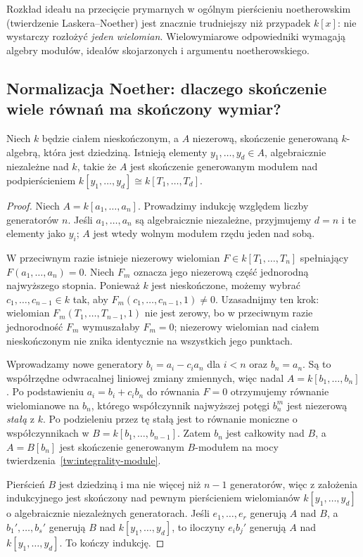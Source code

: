 \begin{uwaga}
Rozkład ideału na przecięcie prymarnych w ogólnym
pierścieniu noetherowskim (twierdzenie Laskera--Noether)
jest znacznie trudniejszy niż przypadek $k[x]$:
nie wystarczy rozłożyć \emph{jeden wielomian}.
Wielowymiarowe odpowiedniki wymagają
algebry modułów, ideałów skojarzonych i argumentu
noetherowskiego.
\end{uwaga}

\subsection{Normalizacja Noether: dlaczego skończenie wiele równań ma skończony wymiar?}
\begin{twierdzenie}
\label{tw:noether-norm}
Niech $k$ będzie ciałem nieskończonym, a $A$
niezerową, skończenie generowaną $k$-algebrą,
która jest dziedziną. Istnieją elementy
$y_1,\ldots,y_d\in A$, algebraicznie niezależne
nad $k$, takie że $A$ jest skończenie generowanym
modułem nad podpierścieniem
$k[y_1,\ldots,y_d]\cong k[T_1,\ldots,T_d]$.
\end{twierdzenie}
\begin{proof}
Niech $A=k[a_1,\ldots,a_n]$. Prowadzimy indukcję
względem liczby generatorów $n$. Jeśli
$a_1,\ldots,a_n$ są algebraicznie niezależne,
przyjmujemy $d=n$ i te elementy jako $y_i$;
$A$ jest wtedy wolnym modułem rzędu jeden nad sobą.

W przeciwnym razie istnieje niezerowy wielomian
$F\in k[T_1,\ldots,T_n]$ spełniający
$F(a_1,\ldots,a_n)=0$. Niech $F_m$ oznacza
jego niezerową część jednorodną najwyższego stopnia.
Ponieważ $k$ jest nieskończone, możemy wybrać
$c_1,\ldots,c_{n-1}\in k$ tak, aby
$F_m(c_1,\ldots,c_{n-1},1)\ne0$.
Uzasadnijmy ten krok: wielomian
$F_m(T_1,\ldots,T_{n-1},1)$ nie jest zerowy,
bo w przeciwnym razie jednorodność $F_m$
wymuszałaby $F_m=0$; niezerowy wielomian
nad ciałem nieskończonym nie znika identycznie
na wszystkich jego punktach.

Wprowadzamy nowe generatory
$b_i=a_i-c_i a_n$ dla $i<n$ oraz $b_n=a_n$.
Są to współrzędne odwracalnej liniowej zmiany
zmiennych, więc nadal $A=k[b_1,\ldots,b_n]$.
Po podstawieniu $a_i=b_i+c_i b_n$ do równania
$F=0$ otrzymujemy równanie wielomianowe
na $b_n$, którego współczynnik najwyższej potęgi
$b_n^m$ jest niezerową \emph{stałą} z $k$.
Po podzieleniu przez tę stałą jest to równanie
moniczne o współczynnikach w
$B=k[b_1,\ldots,b_{n-1}]$. Zatem $b_n$
jest całkowity nad $B$, a $A=B[b_n]$ jest
skończenie generowanym $B$-modułem na mocy
twierdzenia~\ref{tw:integrality-module}.

Pierścień $B$ jest dziedziną i ma nie więcej
niż $n-1$ generatorów, więc z założenia indukcyjnego
jest skończony nad pewnym pierścieniem wielomianów
$k[y_1,\ldots,y_d]$ o algebraicznie niezależnych
generatorach. Jeśli $e_1,\ldots,e_r$ generują
$A$ nad $B$, a $b_1',\ldots,b_s'$ generują $B$
nad $k[y_1,\ldots,y_d]$, to iloczyny $e_i b_j'$
generują $A$ nad $k[y_1,\ldots,y_d]$.
To kończy indukcję.
\end{proof}

